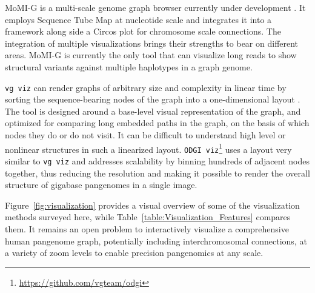 

MoMI-G is a multi-scale genome graph browser currently under development \cite{yokoyama_momi-g:_2019}. 
It employs Sequence Tube Map at nucleotide scale and integrates it into a framework along side a Circos \cite{Krzywinski_2009_Circos} plot for chromosome scale connections. 
The integration of multiple visualizations brings their strengths to bear on different areas. 
MoMI-G is currently the only tool that can visualize long reads to show structural variants against multiple haplotypes in a graph genome.

\texttt{vg viz} can render graphs of arbitrary size and complexity in linear time by sorting the sequence-bearing nodes of the graph into a one-dimensional layout \citep{Garrison_2019}. 
The tool is designed around a base-level visual representation of the graph, and optimized for comparing long embedded paths in the graph, on the basis of which nodes they do or do not visit. 
It can be difficult to understand high level or nonlinear structures in such a linearized layout. 
\texttt{ODGI viz}\footnote{\url{https://github.com/vgteam/odgi}} uses a layout very similar to \texttt{vg viz} and addresses scalability by binning hundreds of adjacent nodes together, thus reducing the resolution and making it possible to render the overall structure of gigabase pangenomes in a single image.

Figure~\ref{fig:visualization} provides a visual overview of some of the visualization methods surveyed here, while Table~\ref{table:Visualization_Features} compares them.
It remains an open problem to interactively visualize a comprehensive human pangenome graph, potentially including interchromosomal connections, at a variety of zoom levels to enable precision pangenomics at any scale.

